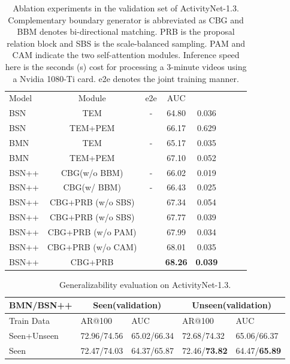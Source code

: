 \documentclass[letterpaper]{article} \usepackage{aaai21}  \usepackage{times}  \usepackage{helvet} \usepackage{courier}  \usepackage[hyphens]{url}  \usepackage{graphicx} \urlstyle{rm} \def\UrlFont{\rm}  \usepackage{natbib}  \usepackage{amsmath,amssymb} \usepackage{caption} \frenchspacing  \usepackage{color}
\begin{document}
 
\setlength{\tabcolsep}{6pt}
\begin{table}[t]
\begin{center}
		\caption{Ablation experiments in the validation set of ActivityNet-1.3. Complementary boundary generator is abbreviated as CBG and BBM denotes bi-directional matching. PRB is the proposal relation block and SBS is the scale-balanced sampling. PAM and CAM indicate the two self-attention modules. Inference speed here is the seconds (s) cost  for processing a 3-minute videos using a Nvidia 1080-Ti card. e2e denotes the joint training manner. }
		\begin{tabular}{p{1cm}ccccccc}
			\toprule
			Model & Module & e2e & AUC &  \tabularnewline
			\noalign{\smallskip}
			\hline  
			\noalign{\smallskip}
			BSN & TEM & - & 64.80 & 0.036 \tabularnewline
			BSN & TEM+PEM &   & 66.17 & 0.629 \tabularnewline
			BMN & TEM & - & 65.17  & 0.035  \tabularnewline
			BMN & TEM+PEM &  & 67.10  & 0.052 \tabularnewline
			\noalign{\smallskip}
			\hline  
			\noalign{\smallskip}
			BSN++ & CBG(w/o BBM) & -  & 66.02  & 0.019  \tabularnewline
			BSN++ & CBG(w/ BBM) & -  & 66.43  & 0.025 \tabularnewline
			BSN++ & CBG+PRB (w/o SBS) &   & 67.34  & 0.054 \tabularnewline
			BSN++ & CBG+PRB (w/o SBS) &   & 67.77  & 0.039 \tabularnewline
			BSN++ & CBG+PRB (w/o PAM) &   & 67.99   & 0.034 \tabularnewline
			BSN++ & CBG+PRB (w/o CAM) &   & 68.01   & 0.035 \tabularnewline
			BSN++ & CBG+PRB  &  & \textbf{68.26}  & \textbf{0.039} \tabularnewline
			
			\bottomrule 
		\end{tabular}
		\label{table_ablation_anet}
	\end{center}
\end{table}

  \setlength{\tabcolsep}{8pt}
  \begin{table}[t]
\centering
  	\caption{Generalizability evaluation on ActivityNet-1.3.}
  	\small
  	\begin{tabular}{p{1.4cm}p{1.1cm}<{\centering}p{1.1cm}<{\centering}p{1.1cm}<{\centering}p{1.2cm}<{\centering}}
  		\toprule
  		BMN/BSN++ & \multicolumn{2}{c}{Seen(validation)} & \multicolumn{2}{c}{Unseen(validation)}   \\
  		\hline
  		Train Data  & AR@100 &  AUC  & AR@100  & AUC  \\
	 	\hline
  		Seen+Unseen & 72.96/74.56 &  65.02/66.34 &  72.68/74.32 & 65.06/66.37\\
  		Seen & 72.47/74.03 & 64.37/65.87  & 72.46/\textbf{73.82} & 64.47/\textbf{65.89} \\
  		\bottomrule
  	\end{tabular}
  	\label{generalizability}
\end{table}
  
\end{document}
